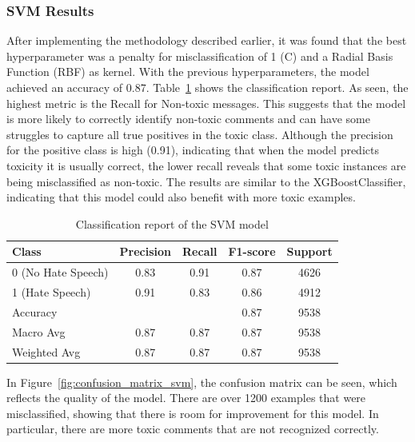\subsubsection{SVM Results}
After implementing the methodology described earlier, it was found that the best hyperparameter was a penalty for misclassification of 1 (C) and a Radial Basis Function (RBF) as kernel. With the previous hyperparameters, the model achieved an accuracy of 0.87. 
Table~\ref{tab:svm_classification_report} shows the classification report. As seen, the highest metric is the Recall for Non-toxic messages. This suggests that the model is more likely to correctly identify non-toxic comments and can have some struggles to capture all true positives in the toxic class. Although the precision for the positive class is high (0.91), indicating that when the model predicts toxicity it is usually correct, the lower recall reveals that some toxic instances are being misclassified as non-toxic. The results are similar to the XGBoostClassifier, indicating that this model could also benefit with more toxic examples.

\begin{table}[H]
    \centering
    \caption{Classification report of the SVM model}
    \label{tab:svm_classification_report}
    \begin{tabular}{lcccc}
        \toprule
        Class & Precision & Recall & F1-score & Support \\
        \midrule
        0 (No Hate Speech) & 0.83 & 0.91 & 0.87 & 4626 \\
        1 (Hate Speech)    & 0.91 & 0.83 & 0.86 & 4912 \\
        \midrule
        Accuracy           &      &      &  0.87 & 9538 \\
        Macro Avg          & 0.87 & 0.87 & 0.87 & 9538 \\
        Weighted Avg       & 0.87 & 0.87 & 0.87 & 9538 \\
        \bottomrule
    \end{tabular}
\end{table}

In Figure~\ref{fig:confusion_matrix_svm}, the confusion matrix can be seen, which reflects the quality of the model. There are over 1200 examples that were misclassified, showing that there is room for improvement for this model. In particular, there are more toxic comments that are not recognized correctly.

